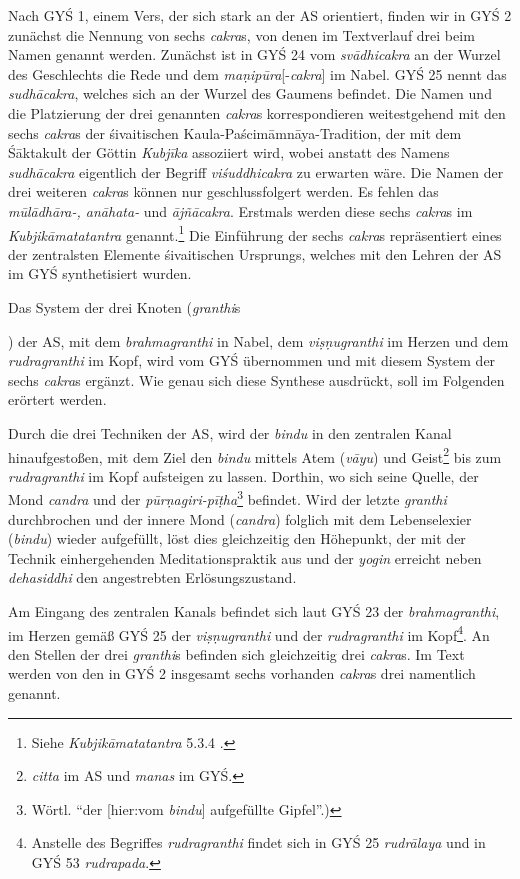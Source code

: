\documentclass[a4paper,12pt]{article}
\begin{document}
{      Nach GYŚ 1, einem Vers, der sich stark an der AS orientiert, finden wir in GYŚ 2 zunächst die Nennung von sechs \textit{cakra}s, von denen im Textverlauf drei beim Namen genannt werden. Zunächst ist in GYŚ 24 vom \textit{svādhicakra} an der Wurzel des Geschlechts die Rede und dem \textit{maṇipūra}[-\textit{cakra}] im Nabel. GYŚ 25 nennt das \textit{sudhācakra}, welches sich an der Wurzel des Gaumens befindet. Die Namen und die Platzierung der drei genannten \textit{cakra}s korrespondieren weitestgehend mit den sechs \textit{cakra}s der śivaitischen Kaula-Paścimāmnāya-Tradition, der mit dem Śāktakult der Göttin \textit{Kubjīka} assoziiert wird, wobei anstatt des Namens \textit{sudhācakra} eigentlich der Begriff \textit{viśuddhicakra} zu erwarten wäre. Die Namen der drei weiteren \textit{cakra}s können nur geschlussfolgert werden. Es fehlen das \textit{mūlādhāra-, anāhata-} und \textit{ājñācakra}. Erstmals werden diese sechs \textit{cakra}s im \textit{Kubjikāmatatantra} genannt.\footnote{Siehe \textit{Kubjikāmatatantra} 5.3.4 \parencite{kubjika}.} Die Einführung der sechs \textit{cakra}s repräsentiert eines der zentralsten Elemente śivaitischen Ursprungs, welches mit den Lehren der AS im GYŚ synthetisiert wurden.

Das System der drei Knoten (\textit{granthi}s}) der AS, mit dem \textit{brahmagranthi} in Nabel, dem \textit{viṣṇugranthi} im Herzen und dem \textit{rudragranthi} im Kopf, wird vom GYŚ übernommen und mit diesem System der sechs \textit{cakra}s ergänzt. Wie genau sich diese Synthese ausdrückt, soll im Folgenden erörtert werden.

Durch die drei Techniken der AS, wird der \textit{bindu} in den zentralen Kanal hinaufgestoßen, mit dem Ziel den \textit{bindu} mittels Atem (\textit{vāyu}) und Geist\footnote{\textit{citta} im AS und \textit{manas} im GYŚ.} bis zum \textit{rudragranthi} im Kopf aufsteigen zu lassen. Dorthin, wo sich seine Quelle, der Mond \textit{candra} und der \textit{pūrṇagiri-pīṭha}\footnote{Wörtl. ``der [hier:vom \textit{bindu}] aufgefüllte Gipfel''.)} befindet. Wird der letzte \textit{granthi} durchbrochen und der innere Mond (\textit{candra}) folglich mit dem Lebenselexier (\textit{bindu}) wieder aufgefüllt, löst dies gleichzeitig den Höhepunkt, der mit der Technik einhergehenden Meditationspraktik aus und der \textit{yogin} erreicht neben \textit{dehasiddhi} den angestrebten Erlösungszustand.

Am Eingang des zentralen Kanals befindet sich laut GYŚ 23 der \textit{brahmagranthi}, im Herzen gemäß GYŚ 25 der \textit{viṣṇugranthi} und der \textit{rudragranthi} im Kopf\footnote{Anstelle des Begriffes \textit{rudragranthi} findet sich in GYŚ 25 \textit{rudrālaya} und in GYŚ 53 \textit{rudrapada}.}. An den Stellen der drei \textit{granthi}s befinden sich gleichzeitig drei \textit{cakra}s. Im Text werden von den in GYŚ 2 insgesamt sechs vorhanden \textit{cakra}s drei namentlich genannt.
\end{document}

